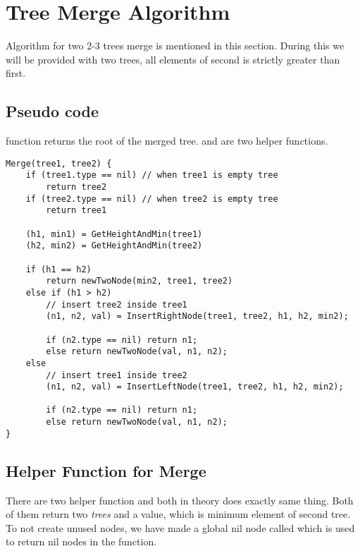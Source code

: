 \section{Tree Merge Algorithm}
Algorithm for two 2-3 trees merge is mentioned in this section. During this we will be provided with two trees, all elements of second is strictly greater than first.

\subsection{Pseudo code}
 function returns the root of the merged tree.
 and  are two helper functions.
\begin{lstlisting}
Merge(tree1, tree2) {
    if (tree1.type == nil) // when tree1 is empty tree
    	return tree2
    if (tree2.type == nil) // when tree2 is empty tree
    	return tree1
    
    (h1, min1) = GetHeightAndMin(tree1)
    (h2, min2) = GetHeightAndMin(tree2)
    
    if (h1 == h2)
    	return newTwoNode(min2, tree1, tree2)
    else if (h1 > h2) 
        // insert tree2 inside tree1
    	(n1, n2, val) = InsertRightNode(tree1, tree2, h1, h2, min2);
    
    	if (n2.type == nil) return n1;
    	else return newTwoNode(val, n1, n2);
    else
        // insert tree1 inside tree2
    	(n1, n2, val) = InsertLeftNode(tree1, tree2, h1, h2, min2);
    	
    	if (n2.type == nil) return n1;
    	else return newTwoNode(val, n1, n2);
}
\end{lstlisting}

\subsection{Helper Function for Merge}
There are two helper function  and  both in theory does exactly same thing. Both of them return two \textit{trees} and a value, which is minimum element of second tree. To not create unused nodes, we have made a global nil node called  which is used to return nil nodes in the function.

